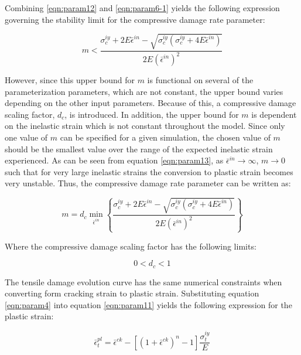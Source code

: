 Combining \ref{eqn:param12} and \ref{eqn:param6-1} yields the following expression governing the stability limit for the compressive damage rate parameter:

\begin{equation}
m<\frac{\sigma_{c}^{iy}+2E\bar{\epsilon}^{in}-\sqrt{\sigma_{c}^{iy}\left(\sigma_{c}^{iy}+4E\bar{\epsilon}^{in}\right)}}{2E\left(\bar{\epsilon}^{in}\right)^{2}}\label{eqn:param13}
\end{equation}

However, since this upper bound for $m$ is functional on several of the parameterization parameters, which are not constant, the upper bound varies depending on the other input parameters. Because of this, a compressive damage scaling factor, $d_c$, is introduced. In addition, the upper bound for $m$ is dependent on the inelastic strain which is not constant throughout the model. Since only one value of $m$ can be specified for a given simulation, the chosen value of $m$ should be the smallest value over the range of the expected inelastic strain experienced. As can be seen from equation \ref{eqn:param13}, as $\bar{\epsilon}^{in} \rightarrow \infty$, $m\rightarrow0$ such that for very large inelastic strains the conversion to plastic strain becomes very unstable. Thus, the compressive damage rate parameter can be written as:

\begin{equation}
m=d_{c}\min_{\bar{\epsilon}^{in}}\left\{\frac{\sigma_{c}^{iy}+2E\bar{\epsilon}^{in}-\sqrt{\sigma_{c}^{iy}\left(\sigma_{c}^{iy}+4E\bar{\epsilon}^{in}\right)}}{2E\left(\bar{\epsilon}^{in}\right)^{2}}\right\}
\label{eqn:param14}
\end{equation}


Where the compressive damage scaling factor has the following limits:

\begin{equation}
0<d_{c}<1\label{eqn:param15}
\end{equation}


The tensile damage evolution curve has the same numerical constraints when converting form cracking strain to plastic strain. Substituting equation \ref{eqn:param4} into equation \ref{eqn:param11} yields the following expression for the plastic strain:

\begin{equation}
\bar{\epsilon}_{t}^{pl}=\bar{\epsilon}^{ck}-\left[\left(1+\bar{\epsilon}^{ck}\right)^{n}-1\right]\frac{\sigma_{t}^{iy}}{E}\label{eqn:param5-1}
\end{equation}


